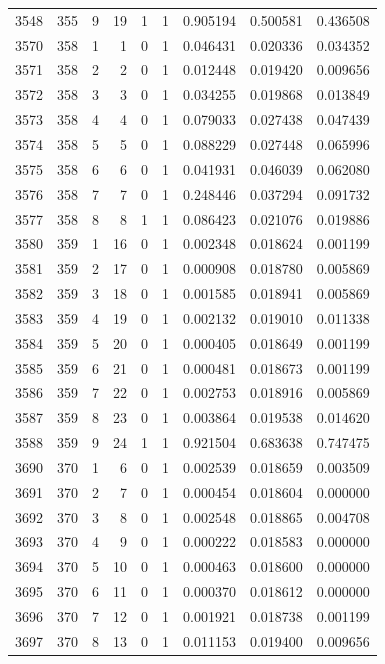 \begin{longtable}{rrrrrrrrr}
3548 & 355 & 9 & 19 & 1 & 1 & 0.905194 & 0.500581 & 0.436508 \\
3570 & 358 & 1 & 1 & 0 & 1 & 0.046431 & 0.020336 & 0.034352 \\
3571 & 358 & 2 & 2 & 0 & 1 & 0.012448 & 0.019420 & 0.009656 \\
3572 & 358 & 3 & 3 & 0 & 1 & 0.034255 & 0.019868 & 0.013849 \\
3573 & 358 & 4 & 4 & 0 & 1 & 0.079033 & 0.027438 & 0.047439 \\
3574 & 358 & 5 & 5 & 0 & 1 & 0.088229 & 0.027448 & 0.065996 \\
3575 & 358 & 6 & 6 & 0 & 1 & 0.041931 & 0.046039 & 0.062080 \\
3576 & 358 & 7 & 7 & 0 & 1 & 0.248446 & 0.037294 & 0.091732 \\
3577 & 358 & 8 & 8 & 1 & 1 & 0.086423 & 0.021076 & 0.019886 \\
3580 & 359 & 1 & 16 & 0 & 1 & 0.002348 & 0.018624 & 0.001199 \\
3581 & 359 & 2 & 17 & 0 & 1 & 0.000908 & 0.018780 & 0.005869 \\
3582 & 359 & 3 & 18 & 0 & 1 & 0.001585 & 0.018941 & 0.005869 \\
3583 & 359 & 4 & 19 & 0 & 1 & 0.002132 & 0.019010 & 0.011338 \\
3584 & 359 & 5 & 20 & 0 & 1 & 0.000405 & 0.018649 & 0.001199 \\
3585 & 359 & 6 & 21 & 0 & 1 & 0.000481 & 0.018673 & 0.001199 \\
3586 & 359 & 7 & 22 & 0 & 1 & 0.002753 & 0.018916 & 0.005869 \\
3587 & 359 & 8 & 23 & 0 & 1 & 0.003864 & 0.019538 & 0.014620 \\
3588 & 359 & 9 & 24 & 1 & 1 & 0.921504 & 0.683638 & 0.747475 \\
3690 & 370 & 1 & 6 & 0 & 1 & 0.002539 & 0.018659 & 0.003509 \\
3691 & 370 & 2 & 7 & 0 & 1 & 0.000454 & 0.018604 & 0.000000 \\
3692 & 370 & 3 & 8 & 0 & 1 & 0.002548 & 0.018865 & 0.004708 \\
3693 & 370 & 4 & 9 & 0 & 1 & 0.000222 & 0.018583 & 0.000000 \\
3694 & 370 & 5 & 10 & 0 & 1 & 0.000463 & 0.018600 & 0.000000 \\
3695 & 370 & 6 & 11 & 0 & 1 & 0.000370 & 0.018612 & 0.000000 \\
3696 & 370 & 7 & 12 & 0 & 1 & 0.001921 & 0.018738 & 0.001199 \\
3697 & 370 & 8 & 13 & 0 & 1 & 0.011153 & 0.019400 & 0.009656 \\

\end{longtable}
